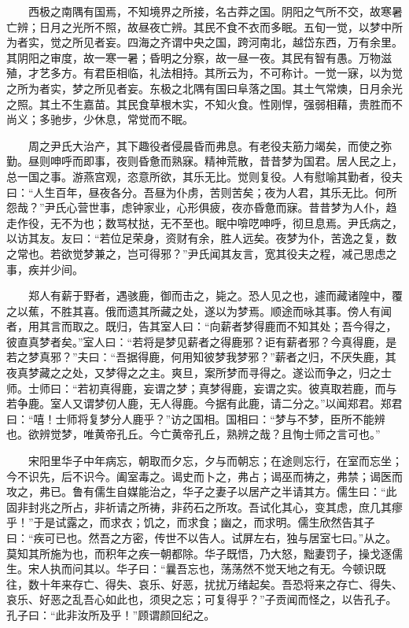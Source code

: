 　　西极之南隅有国焉，不知境界之所接，名古莽之国。阴阳之气所不交，故寒暑亡辨；日月之光所不照，故昼夜亡辨。其民不食不衣而多眠。五旬一觉，以梦中所为者实，觉之所见者妄。四海之齐谓中央之国，跨河南北，越岱东西，万有余里。其阴阳之审度，故一寒一暑；昏明之分察，故一昼一夜。其民有智有愚。万物滋殖，才艺多方。有君臣相临，礼法相持。其所云为，不可称计。一觉一寐，以为觉之所为者实，梦之所见者妄。东极之北隅有国曰阜落之国。其土气常燠，日月余光之照。其土不生嘉苗。其民食草根木实，不知火食。性刚悍，强弱相藉，贵胜而不尚义；多驰步，少休息，常觉而不眠。

　　周之尹氏大治产，其下趣役者侵晨昏而弗息。有老役夫筋力竭矣，而使之弥勤。昼则呻呼而即事，夜则昏惫而熟寐。精神荒散，昔昔梦为国君。居人民之上，总一国之事。游燕宫观，恣意所欲，其乐无比。觉则复役。人有慰喻其勤者，役夫曰：``人生百年，昼夜各分。吾昼为仆虏，苦则苦矣；夜为人君，其乐无比。何所怨哉？''尹氏心营世事，虑钟家业，心形俱疲，夜亦昏惫而寐。昔昔梦为人仆，趋走作役，无不为也；数骂杖挞，无不至也。眠中啽呓呻呼，彻旦息焉。尹氏病之，以访其友。友曰：``若位足荣身，资财有余，胜人远矣。夜梦为仆，苦逸之复，数之常也。若欲觉梦兼之，岂可得邪？''尹氏闻其友言，宽其役夫之程，减己思虑之事，疾并少间。

　　郑人有薪于野者，遇骇鹿，御而击之，毙之。恐人见之也，遽而藏诸隍中，覆之以蕉，不胜其喜。俄而遗其所藏之处，遂以为梦焉。顺途而咏其事。傍人有闻者，用其言而取之。既归，告其室人曰：``向薪者梦得鹿而不知其处；吾今得之，彼直真梦者矣。''室人曰：``若将是梦见薪者之得鹿邪？讵有薪者邪？今真得鹿，是若之梦真邪？''夫曰：``吾据得鹿，何用知彼梦我梦邪？''薪者之归，不厌失鹿，其夜真梦藏之之处，又梦得之之主。爽旦，案所梦而寻得之。遂讼而争之，归之士师。士师曰：``若初真得鹿，妄谓之梦；真梦得鹿，妄谓之实。彼真取若鹿，而与若争鹿。室人又谓梦仞人鹿，无人得鹿。今据有此鹿，请二分之。''以闻郑君。郑君曰：``嘻！士师将复梦分人鹿乎？''访之国相。国相曰：``梦与不梦，臣所不能辨也。欲辨觉梦，唯黄帝孔丘。今亡黄帝孔丘，熟辨之哉？且恂士师之言可也。''

　　宋阳里华子中年病忘，朝取而夕忘，夕与而朝忘；在途则忘行，在室而忘坐；今不识先，后不识今。阖室毒之。谒史而卜之，弗占；谒巫而祷之，弗禁；谒医而攻之，弗已。鲁有儒生自媒能治之，华子之妻子以居产之半请其方。儒生曰：``此固非封兆之所占，非祈请之所祷，非药石之所攻。吾试化其心，变其虑，庶几其瘳乎！''于是试露之，而求衣；饥之，而求食；幽之，而求明。儒生欣然告其子曰：``疾可已也。然吾之方密，传世不以告人。试屏左右，独与居室七曰。''从之。莫知其所施为也，而积年之疾一朝都除。华子既悟，乃大怒，黜妻罚子，操戈逐儒生。宋人执而问其以。华子曰：``曩吾忘也，荡荡然不觉天地之有无。今顿识既往，数十年来存亡、得失、哀乐、好恶，扰扰万绪起矣。吾恐将来之存亡、得失、哀乐、好恶之乱吾心如此也，须臾之忘；可复得乎？''子贡闻而怪之，以告孔子。孔子曰：``此非汝所及乎！''顾谓颜回纪之。


